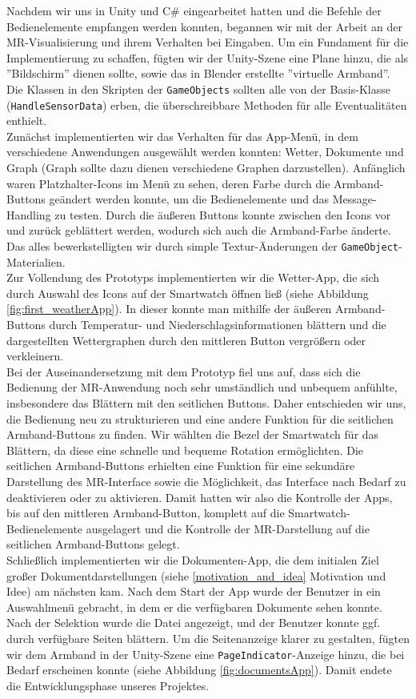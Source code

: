 \documentclass[11pt, a4paper]{article}
\begin{document}
Nachdem wir uns in Unity und C\# eingearbeitet hatten und die Befehle der Bedienelemente empfangen werden konnten, begannen wir mit der Arbeit an der MR-Visualisierung und ihrem Verhalten bei Eingaben. Um ein Fundament für die Implementierung zu schaffen, fügten wir der Unity-Szene eine Plane hinzu, die als ''Bildschirm'' dienen sollte, sowie das in Blender erstellte ''virtuelle Armband''. Die Klassen in den Skripten der \texttt{GameObjects} sollten alle von der Basis-Klasse (\texttt{HandleSensorData}) erben, die überschreibbare Methoden für alle Eventualitäten enthielt.\\
Zunächst implementierten wir das Verhalten für das App-Menü, in dem verschiedene Anwendungen ausgewählt werden konnten: Wetter, Dokumente und Graph (Graph sollte dazu dienen verschiedene Graphen darzustellen). Anfänglich waren Platzhalter-Icons im Menü zu sehen, deren Farbe durch die Armband-Buttons geändert werden konnte, um die Bedienelemente und das Message-Handling zu testen. Durch die äußeren Buttons konnte zwischen den Icons vor und zurück geblättert werden, wodurch sich auch die Armband-Farbe änderte. Das alles bewerkstelligten wir durch simple Textur-Änderungen der \texttt{GameObject}-Materialien.\\
Zur Vollendung des Prototyps implementierten wir die Wetter-App, die sich durch Auswahl des Icons auf der Smartwatch öffnen ließ (siehe Abbildung \ref{fig:first_weatherApp}). In dieser konnte man mithilfe der äußeren Armband-Buttons durch Temperatur- und Niederschlagsinformationen blättern und die dargestellten Wettergraphen durch den mittleren Button vergrößern oder verkleinern.\\
Bei der Auseinandersetzung mit dem Prototyp fiel uns auf, dass sich die Bedienung der MR-Anwendung noch sehr umständlich und unbequem anfühlte, insbesondere das Blättern mit den seitlichen Buttons. Daher entschieden wir uns, die Bedienung neu zu strukturieren und eine andere Funktion für die seitlichen Armband-Buttons zu finden. Wir wählten die Bezel der Smartwatch für das Blättern, da diese eine schnelle und bequeme Rotation ermöglichten. Die seitlichen Armband-Buttons erhielten eine Funktion für eine sekundäre Darstellung des MR-Interface sowie die Möglichkeit, das Interface nach Bedarf zu deaktivieren oder zu aktivieren. Damit hatten wir also die Kontrolle der Apps, bis auf den mittleren Armband-Button, komplett auf die Smartwatch-Bedienelemente ausgelagert und die Kontrolle der MR-Darstellung auf die seitlichen Armband-Buttons gelegt.\\
Schließlich implementierten wir die Dokumenten-App, die dem initialen Ziel großer Dokumentdarstellungen (siehe \ref{motivation_and_idea} Motivation und Idee) am nächsten kam. Nach dem Start der App wurde der Benutzer in ein Auswahlmenü gebracht, in dem er die verfügbaren Dokumente sehen konnte. Nach der Selektion wurde die Datei angezeigt, und der Benutzer konnte ggf. durch verfügbare Seiten blättern. Um die Seitenanzeige klarer zu gestalten, fügten wir dem Armband in der Unity-Szene eine \texttt{PageIndicator}-Anzeige hinzu, die bei Bedarf erscheinen konnte (siehe Abbildung \ref{fig:documentsApp}). Damit endete die Entwicklungsphase unseres Projektes.
\end{document}
